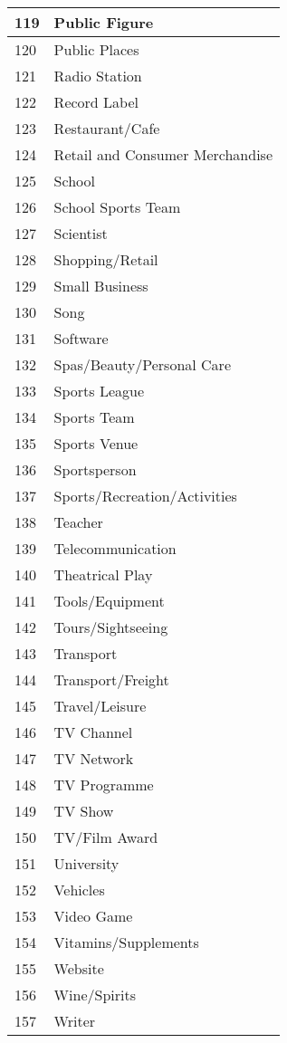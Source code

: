 \begin{longtable}{|p{1cm}|p{4in}|}
119&Public Figure \\ \hline
120&Public Places \\ \hline
121&Radio Station \\ \hline
122&Record Label \\ \hline
123&Restaurant/Cafe \\ \hline
124&Retail and Consumer Merchandise \\ \hline
125&School \\ \hline
126&School Sports Team \\ \hline
127&Scientist \\ \hline
128&Shopping/Retail \\ \hline
129&Small Business \\ \hline
130&Song \\ \hline
131&Software \\ \hline
132&Spas/Beauty/Personal Care \\ \hline
133&Sports League \\ \hline
134&Sports Team \\ \hline
135&Sports Venue \\ \hline
136&Sportsperson \\ \hline
137&Sports/Recreation/Activities \\ \hline
138&Teacher \\ \hline
139&Telecommunication \\ \hline
140&Theatrical Play \\ \hline
141&Tools/Equipment \\ \hline
142&Tours/Sightseeing \\ \hline
143&Transport \\ \hline
144&Transport/Freight \\ \hline
145&Travel/Leisure \\ \hline
146&TV Channel \\ \hline
147&TV Network \\ \hline
148&TV Programme \\ \hline
149&TV Show \\ \hline
150&TV/Film Award \\ \hline
151&University \\ \hline
152&Vehicles \\ \hline
153&Video Game \\ \hline
154&Vitamins/Supplements \\ \hline
155&Website \\ \hline
156&Wine/Spirits \\ \hline
157&Writer \\ \hline
\end{longtable}


